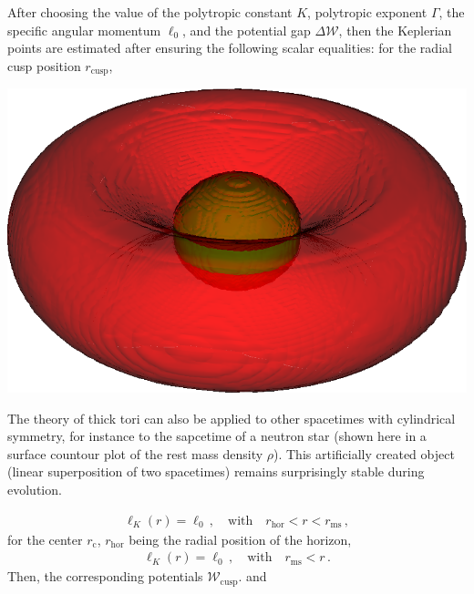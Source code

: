 
After choosing the value of the polytropic constant $K$, polytropic
exponent $\Gamma$, the specific angular momentum $\ell_0$, and the
potential gap $\Delta \mathcal{W}$, then the Keplerian points are
estimated after ensuring the following scalar equalities: for the radial
cusp position $r_{\text{cusp}}$, 
\begin{marginfigure}
	\includegraphics[width=\textwidth]{sven-torus/3d-torus.png}
	\caption[
	  3D plot of a NS-Torus spacetime, rendered with Visit, \exclusive
	]{
	  The theory of thick tori can also be applied to other spacetimes
	  with cylindrical symmetry, for instance to the sapcetime of a
	  neutron star (shown here in a surface countour plot of the rest
	  mass density $\rho$). This artificially created object
	  (linear superposition of two spacetimes) remains surprisingly
	  stable during evolution.
	}
\end{marginfigure}
%
\begin{align}
\ell_K(r) = \ell_0\,, \quad \text{with} \quad r_{\text{hor}}< r <
r_{\text{ms}}\,,
\end{align}
%
for the center $r_{\text{c}}$,  $r_{\text{hor}}$ being the radial position of the horizon,
%
\begin{align}
\ell_K(r) = \ell_0\,, \quad \text{with} \quad r_{\text{ms}} < r\,.
\end{align}
%
Then, the corresponding potentials $\mathcal{W}_{\text{cusp}}$. and
